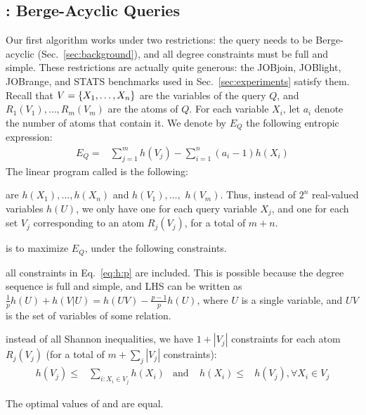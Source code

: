 \subsection{\lptdb: Berge-Acyclic Queries}

Our first algorithm works under two restrictions: the query needs to
be Berge-acyclic (Sec.~\ref{sec:background}), and all degree
constraints must be full and simple.  These restrictions are actually
quite generous: the JOBjoin, JOBlight, JOBrange, and STATS benchmarks used in Sec.~\ref{sec:experiments}
satisfy them.  Recall that $V= \{X_1, \ldots, X_n\}$ are the
variables of the query $Q$, and $R_1(V_1), \ldots, R_m(V_m)$ are the
atoms of $Q$.  For each variable $X_i$, let $a_i$ denote the number of atoms
that contain it.  We denote by $E_Q$ the following entropic
expression:
%
\begin{align}
  E_Q = & \sum^m_{j=1} h(V_j) - \sum^n_{i=1} (a_i-1) h(X_i) \label{eq:expr:q}
\end{align}
%
The linear program called \lptdb is the following:

\smallskip

 are $h(X_1),\ldots,h(X_n)$ and
$h(V_1),\ldots,$ $h(V_m)$. Thus, instead of $2^n$ real-valued variables
$h(U)$, we only have one for each query variable $X_j$, and one for
each set $V_j$ corresponding to an atom $R_j(V_j)$, for a total of
$m+n$.

\smallskip

 is to maximize $E_Q$, under the
following constraints.

\smallskip

 all constraints in
Eq.~\eqref{eq:h:p} are included.  This is possible
because the degree sequence is full and simple, and LHS can be written
as $\frac{1}{p}h(U)+h(V|U) = h(UV) - \frac{p-1}{p}h(U)$, where $U$ is
a single variable, and $UV$ is the set of variables of some
relation.

\smallskip

 instead of all Shannon
inequalities, we have $1+|V_j|$ constraints for each atom $R_j(V_j)$
(for a total of $m+\sum_j|V_j|$ constraints):
%
\begin{align*}
  h(V_j) \leq & \sum_{i: X_i \in V_j} h(X_i) &\text{and}\ \ \ \ \ h(X_i) \leq  &h(V_j), \forall X_i \in V_j
\end{align*}

\begin{theorem} \label{th:lpbase:eq:lptdb}
  The optimal values of \lpbase and \lptdb are equal.
\end{theorem}

